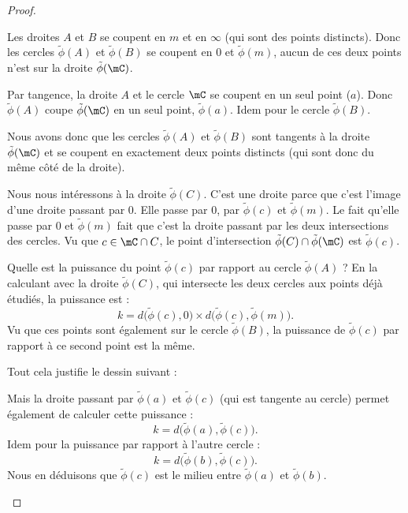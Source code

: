 \begin{proof}
\begin{subproof}
		Les droites \( A\) et \( B\) se coupent en \( m\) et en \( \infty\) (qui sont des points distincts). Donc les cercles \( \tilde \phi(A)\) et \( \tilde \phi(B)\) se coupent en \( 0\) et \( \tilde \phi(m)\), aucun de ces deux points n'est sur la droite \( \tilde \phi(\mC)\).

		Par tangence, la droite \( A\) et le cercle \( \mC\) se coupent en un seul point (\( a\)). Donc \( \tilde \phi(A)\) coupe \( \tilde \phi(\mC)\) en un seul point, \( \tilde \phi(a)\). Idem pour le cercle \( \tilde \phi(B)\).

		Nous avons donc que les cercles \( \tilde \phi(A)\) et \( \tilde \phi(B)\) sont tangents à la droite \( \tilde \phi(\mC)\) et se coupent en exactement deux points distincts (qui sont donc du même côté de la droite).

		Nous nous intéressons à la droite \( \tilde \phi(C)\). C'est une droite parce que c'est l'image d'une droite passant par \( 0\). Elle passe par \( 0\), par \( \tilde \phi(c)\) et \( \tilde \phi(m)\). Le fait qu'elle passe par \( 0\) et \( \tilde \phi(m)\) fait que c'est la droite passant par les deux intersections des cercles. Vu que \( c\in \mC\cap C\), le point d'intersection \( \tilde \phi(C)\cap \tilde \phi(\mC)\) est \( \tilde \phi(c)\).

		Quelle est la puissance du point \( \tilde \phi(c)\) par rapport au cercle \( \tilde \phi(A)\) ? En la calculant avec la droite \( \tilde \phi(C)\), qui intersecte les deux cercles aux points déjà étudiés, la puissance est :
		\begin{equation}
			k=d\big( \tilde \phi(c),0 \big)\times d\big( \tilde \phi(c),\tilde \phi(m) \big).
		\end{equation}
		Vu que ces points sont également sur le cercle \( \tilde \phi(B)\), la puissance de \( \tilde \phi(c)\) par rapport à ce second point est la même.

		Tout cela justifie le dessin suivant :

		\begin{center}
			
		\end{center}

		Mais la droite passant par \( \tilde \phi(a)\) et \( \tilde \phi(c)\) (qui est tangente au cercle) permet également de calculer cette puissance :
		\begin{equation}
			k=d\big( \tilde \phi(a),\tilde \phi(c) \big).
		\end{equation}
		Idem pour la puissance par rapport à l'autre cercle :
		\begin{equation}
			k=d\big( \tilde \phi(b),\tilde \phi(c) \big).
		\end{equation}
		Nous en déduisons que \( \tilde \phi(c)\) est le milieu entre \( \tilde \phi(a)\) et \( \tilde \phi(b)\).


\end{subproof}
\end{proof}
